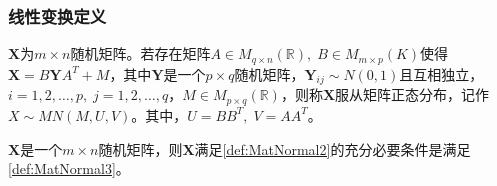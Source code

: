 \subsubsection{线性变换定义}
\begin{definition}\label{def:MatNormal3}
	$\mathbf{X}$为$m\times n$随机矩阵。若存在矩阵$A\in M_{q\times n}(\mathbb{R}),\;B\in M_{m\times p}(K)$使得$\mathbf{X}=B\mathbf{Y}A^T+M$，其中$\mathbf{Y}$是一个$p\times q$随机矩阵，$\mathbf{Y}_{ij}\sim N(0,1)$且互相独立，$i=1,2,\dots,p,\;j=1,2,\dots,q$，$M\in M_{p\times q}(\mathbb{R})$，则称$\mathbf{X}$服从矩阵正态分布，记作$X\sim MN(M,U,V)$。其中，$U=BB^T,\;V=AA^T$。
\end{definition}
\begin{theorem}
	$\mathbf{X}$是一个$m\times n$随机矩阵，则$\mathbf{X}$满足\cref{def:MatNormal2}的充分必要条件是满足\cref{def:MatNormal3}。
\end{theorem}
